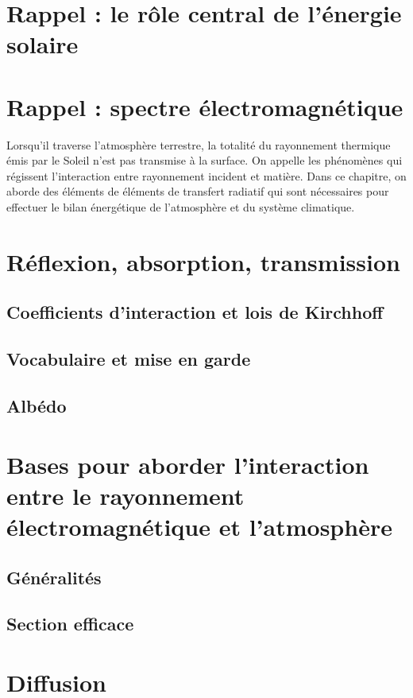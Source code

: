 \documentclass[a4paper,DIV16,10pt]{scrartcl}
\begin{document}
 \inidoc


\mk\section{Rappel : le rôle central de l'énergie solaire}


\mk\section{Rappel : spectre électromagnétique}



\bk Lorsqu'il traverse l'atmosphère terrestre, la totalité du rayonnement thermique émis par le Soleil n'est pas transmise à la surface. On appelle  les phénomènes qui régissent l'interaction entre rayonnement incident et matière. Dans ce chapitre, on aborde des éléments de éléments de transfert radiatif qui sont nécessaires pour effectuer le bilan énergétique de l'atmosphère et du système climatique.

\mk \section{Réflexion, absorption, transmission}
	\sk \subsection{Coefficients d'interaction et lois de Kirchhoff}
		
		
	\sk \subsection{Vocabulaire et mise en garde}
		
	\sk \subsection{Albédo}
		
\mk \section{Bases pour aborder l'interaction entre le rayonnement électromagnétique et l'atmosphère}
	\sk \subsection{Généralités}
		
	\sk \subsection{Section efficace}\label{sec:efficace}
		
\mk \section{Diffusion}
	
\end{document}
